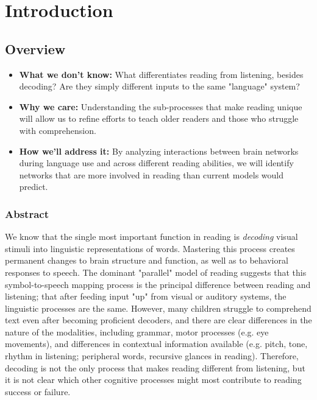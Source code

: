 \chapter{Introduction}

\section{Overview}
\begin{itemize}
	\item \textbf{What we don't know:} What differentiates reading from listening, besides decoding? Are they simply different inputs to the same "language" system?
	\item \textbf{Why we care:} Understanding the sub-processes that make reading unique will allow us to refine efforts to teach older readers and those who struggle with comprehension.
	\item \textbf{How we'll address it:} By analyzing interactions between brain networks during language use and across different reading abilities, we will identify networks that are more involved in reading than current models would predict. 
\end{itemize}

\subsection{Abstract}

We know that the single most important function in reading is \textit{decoding} visual stimuli into linguistic representations of words. Mastering this process creates permanent changes to brain structure and function, as well as to behavioral responses to speech. The dominant "parallel" model of reading suggests that this symbol-to-speech mapping process is the principal difference between reading and listening; that after feeding input "up" from visual or auditory systems, the linguistic processes are the same. However, many children struggle to comprehend text even after becoming proficient decoders, and there are clear differences in the nature of the modalities, including grammar, motor processes (e.g. eye movements), and differences in contextual information available (e.g. pitch, tone, rhythm in listening; peripheral words, recursive glances in reading). Therefore, decoding is not the only process that makes reading different from listening, but it is not clear which other cognitive processes might most contribute to reading success or failure. 

